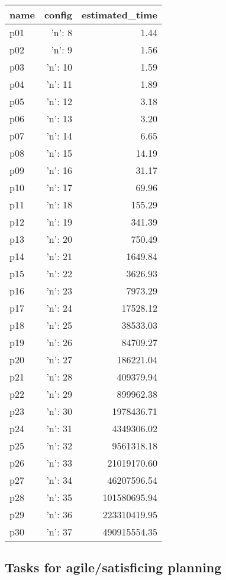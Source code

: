\documentclass{article}
\begin{document}
                            \begin{center}
                            \scriptsize
                            \begin{tabular}{@{}l|r|r@{}}
                            name & config & estimated\_time\\\midrule
                              p01&{'n': 8}&1.44\\
  p02&{'n': 9}&1.56\\
  p03&{'n': 10}&1.59\\
  p04&{'n': 11}&1.89\\
  p05&{'n': 12}&3.18\\
  p06&{'n': 13}&3.20\\
  p07&{'n': 14}&6.65\\
  p08&{'n': 15}&14.19\\
  p09&{'n': 16}&31.17\\
  p10&{'n': 17}&69.96\\
  p11&{'n': 18}&155.29\\
  p12&{'n': 19}&341.39\\
  p13&{'n': 20}&750.49\\
  p14&{'n': 21}&1649.84\\
  p15&{'n': 22}&3626.93\\
  p16&{'n': 23}&7973.29\\
  p17&{'n': 24}&17528.12\\
  p18&{'n': 25}&38533.03\\
  p19&{'n': 26}&84709.27\\
  p20&{'n': 27}&186221.04\\
  p21&{'n': 28}&409379.94\\
  p22&{'n': 29}&899962.38\\
  p23&{'n': 30}&1978436.71\\
  p24&{'n': 31}&4349306.02\\
  p25&{'n': 32}&9561318.18\\
  p26&{'n': 33}&21019170.60\\
  p27&{'n': 34}&46207596.54\\
  p28&{'n': 35}&101580695.94\\
  p29&{'n': 36}&223310419.95\\
  p30&{'n': 37}&490915554.35
                            \end{tabular}
                            \end{center}
                    

                                \subsection*{Tasks for agile/satisficing planning}
                                
\end{document}
